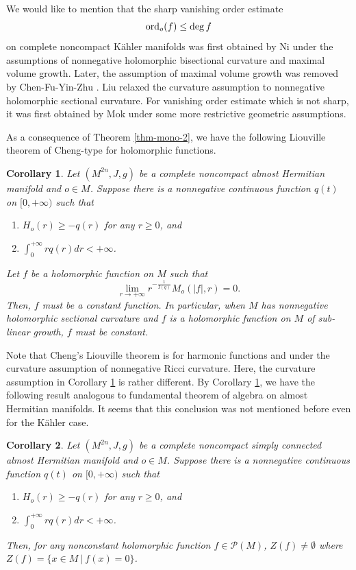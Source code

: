 \documentclass[12pt]{amsart}
\newtheorem{cor}{Corollary}[section]
\theoremstyle{definition}
\theoremstyle{remark}
\numberwithin{equation}{section}
\def\ord{{\rm ord}}
\def\D{\displaystyle}
\begin{document}
We would like to mention that the sharp vanishing order estimate
$$\ord_o(f)\leq \deg f$$
on complete noncompact K\"ahler manifolds was first obtained by Ni \cite{Ni} under the assumptions of nonnegative holomorphic bisectional curvature and maximal volume growth. Later, the assumption of maximal volume growth was removed by Chen-Fu-Yin-Zhu \cite{CFYZ}. Liu \cite{Liu} relaxed the curvature assumption to nonnegative holomorphic sectional curvature. For vanishing order estimate which is not sharp, it was first obtained by Mok \cite{Mok} under some more restrictive geometric assumptions.

As a consequence of Theorem \ref{thm-mono-2}, we have the following Liouville theorem of Cheng-type for holomorphic functions.
\begin{cor}\label{cor-Liouville-holo-2}
Let $(M^{2n},J,g)$ be a complete noncompact almost Hermitian manifold and $o\in M$. Suppose there is a nonnegative continuous function $q(t)$ on $[0,+\infty)$ such that  \begin{enumerate}
\item $H_o(r)\geq -q(r)$ for any $r\geq0$, and
\item $\D\int_0^{+\infty}rq(r)dr<+\infty$.
\end{enumerate} Let $f$ be a holomorphic function on $M$ such that
\begin{equation}\label{eq-sub-linear}
\lim_{r\to +\infty}r^{-\frac{1}{I(q)}}{M_o(|f|,r)}=0.
\end{equation}
Then, $f$ must be a constant function. In particular, when $M$ has nonnegative holomorphic sectional curvature and $f$ is a holomorphic function on $M$ of sub-linear growth, $f$ must be constant.
\end{cor}

Note that Cheng's Liouville theorem is for harmonic functions and under the curvature assumption of nonnegative Ricci curvature. Here, the curvature assumption in Corollary \ref{cor-Liouville-holo-2} is rather different. By Corollary \ref{cor-Liouville-holo-2}, we have the following result analogous to fundamental theorem of algebra on almost Hermitian manifolds. It seems that this conclusion was not mentioned before even for the K\"ahler case.
\begin{cor}\label{cor-fund-holo-2}
Let $(M^{2n},J,g)$ be a complete noncompact simply connected almost Hermitian manifold and $o\in M$. Suppose there is a nonnegative continuous function $q(t)$ on $[0,+\infty)$ such that  \begin{enumerate}
\item $H_o(r)\geq -q(r)$ for any $r\geq0$, and
\item $\D\int_0^{+\infty}rq(r)dr<+\infty$.
\end{enumerate}  Then, for any nonconstant holomorphic function $f\in \mathcal P(M)$, $Z(f)\neq\emptyset$ where $Z(f)=\{x\in M\ |\ f(x)=0\}$.
\end{cor}
\end{document}
